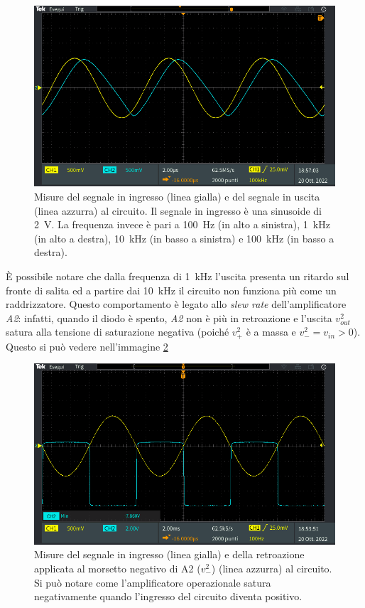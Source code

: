 \begin{figure}[h]
\begin{minipage}{.496\textwidth}
	\end{minipage}
	\begin{minipage}{.496\textwidth}
		\includegraphics[width=\linewidth]{./ImageFiles/Laboratorio 3/TEK00005.PNG}
	\end{minipage}
	\caption{Misure del segnale in ingresso (linea gialla) e del segnale in uscita (linea azzurra) al circuito. Il segnale in ingresso è una sinusoide di \SI{2}{\volt}. La frequenza invece è pari a \SI{100}{\hertz} (in alto a sinistra), \SI{1}{\kilo\hertz} (in alto a destra), \SI{10}{\kilo\hertz} (in basso a sinistra) e \SI{100}{\kilo\hertz} (in basso a destra).}
	\label{fig:voutvsfrequency}
\end{figure}
\`E possibile notare che dalla frequenza di \SI{1}{\kilo\hertz} l'uscita presenta un ritardo sul fronte di salita ed a partire dai \SI{10}{\kilo\hertz} il circuito non funziona più come un raddrizzatore. Questo comportamento è legato allo \textit{slew rate} dell'amplificatore \textit{A2}: infatti, quando il diodo è spento, \textit{A2} non è più in retroazione e l'uscita $v_{out}^2$ satura alla tensione di saturazione negativa (poiché $v_+^2$ è a massa e $v_-^2=v_{in}>0$). Questo si può vedere nell'immagine \ref{fig:a2_no_retro}
\begin{figure}[h]
	\centering
	\includegraphics[width=\linewidth]{./ImageFiles/Laboratorio 3/TEK00002}
	\caption{Misure del segnale in ingresso (linea gialla) e della retroazione applicata al morsetto negativo di A2 ($v_-^2$) (linea azzurra) al circuito. Si può notare come l'amplificatore operazionale satura negativamente quando l'ingresso del circuito diventa positivo.}
	\label{fig:a2_no_retro}
\end{figure}
